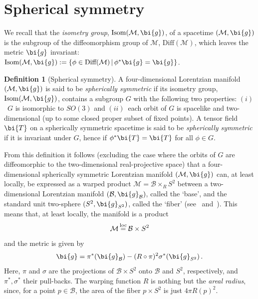 \documentclass
[rmp,aps,twocolumn,showpacs,preprintnumbers,amsmath,amssymb]{revtex4}
\theoremstyle{plain}
\theoremstyle{definition}
\newtheorem{defi}[thm]{Definition}
\theoremstyle{remark}
\newcommand{\M}{\mathcal{M}}                      %
\newcommand{\B}{\mathcal{B}}                      %
\newcommand{\g}{\bg}                            %
\newcommand{\bg}{\bi{g}}
\newcommand{\bT}{\bi{T}}
\begin{document}
\section{Spherical symmetry}
\label{sec:spherical-symmetry}
%
We recall that the \emph{isometry group},
$\mathrm{Isom}(\M,\g)$, of a spacetime $(\M,\g)$ is the subgroup of the 
diffeomorphism group of $\M$, $\mathrm{Diff}(\M)$, which leaves the metric 
$\g$ invariant: 
$\mathrm{Isom}(\M,\g):=\{ \phi \in \mathrm{Diff(\M)} \,|\, \phi^*\g = \g\}$.
%
\begin{defi}[Spherical symmetry]\label{defi:spherical-sym}
A four-dimensional Lorentzian manifold $(\M,\g)$ is said to be 
\emph{spherically symmetric} 
if its isometry group, $\mathrm{Isom}(\M,\g)$, contains a subgroup $G$ 
with the following two properties: $(i)$~$G$ is isomorphic to $SO(3)$ and 
$(ii)$~each orbit of $G$ is spacelike and two-dimensional (up to 
some closed proper subset of fixed points). A tensor field $\bT$ on a 
spherically symmetric spacetime is said to be \emph{spherically symmetric}
if it is invariant under $G$, hence if $\phi^*\bT = \bT$ for all 
$\phi\in G$.
\end{defi}
%
From this definition it follows (excluding the case where the 
orbits of $G$ are diffeomorphic to the two-dimensional 
real-projective space) that a four-dimensional spherically 
symmetric Lorentzian manifold $(\M,\g)$ can, at least locally, 
be expressed as a warped product $\M = \B \times_R S^2$ between a 
two-dimensional Lorentzian manifold $(\B,\g_\B)$, called the 
`base', and the standard unit two-sphere $(S^2,\g_{S^2})$, called 
the `fiber' (see~\cite{Straumann:2004} and~\cite{ONeill:1983}). 
This means that, at least locally, the manifold is a product 
%
\begin{equation}\label{eq:sph-sym-M-warped}
  \M \mathop{=}^{\rm loc} \B \times S^2
\end{equation}
%
and the metric is given by
%
\begin{equation}\label{eq:sph-sym-g-warped}
  \g = \pi^*(\g_\B) - (R \circ \pi)^2 \sigma^*(\g_{S^2}) \,.
\end{equation}
%
Here, $\pi$ and $\sigma$ are the projections of $\B \times S^2$ onto $\B$
and $S^2$, respectively, and $\pi^*,\sigma^*$ their pull-backs.
The warping function $R$ is nothing but the 
\emph{areal radius}, since, 
for a point $p\in\B$, the area of the fiber $p \times S^2$ is just 
$4\pi R(p)^2$.
\end{document}
